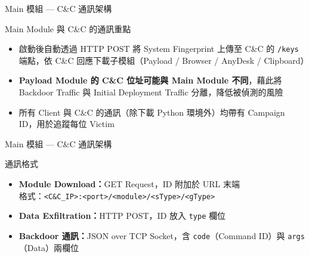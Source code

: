 \documentclass{beamer}
\begin{document}
\begin{frame}{Main 模組 — C\&C 通訊架構}
  \begin{block}{Main Module 與 C\&C 的通訊重點}
    \begin{itemize}
      \item 啟動後自動透過 HTTP POST 將 System Fingerprint 上傳至 C\&C 的 \texttt{/keys} 端點，依 C\&C 回應下載子模組（Payload / Browser / AnyDesk / Clipboard）
      \item \textbf{Payload Module 的 C\&C 位址可能與 Main Module 不同}，藉此將 Backdoor Traffic 與 Initial Deployment Traffic 分離，降低被偵測的風險
      \item 所有 Client 與 C\&C 的通訊（除下載 Python 環境外）均帶有 Campaign ID，用於追蹤每位 Victim
    \end{itemize}
  \end{block}
\end{frame}

\begin{frame}{Main 模組 — C\&C 通訊架構}
  \begin{block}{通訊格式}
    \begin{itemize}
      \item \textbf{Module Download：}GET Request，ID 附加於 URL 末端\\
            格式：\texttt{<C\&C\_IP>:<port>/<module>/<sType>/<gType>}
      \item \textbf{Data Exfiltration：}HTTP POST，ID 放入 \texttt{type} 欄位
      \item \textbf{Backdoor 通訊：}JSON over TCP Socket，含 \texttt{code}（Command ID）與 \texttt{args}（Data）兩欄位
    \end{itemize}
  \end{block}
\end{frame}
\end{document}
